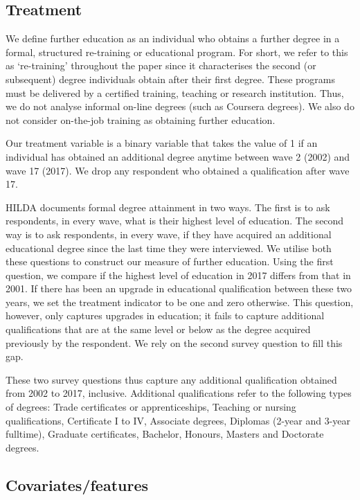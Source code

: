\documentclass[12pt, a4paper]{article}
\begin{document}
\subsection{Treatment}

We define further education as an individual who obtains a further degree in a formal, structured re-training or educational program. For short, we refer to this as `re-training' throughout the paper since it characterises the second (or subsequent) degree individuals obtain after their first degree. These programs must be delivered by a certified training, teaching or research institution. Thus, we do not analyse informal on-line degrees (such as Coursera degrees). We also do not consider on-the-job training as obtaining further education.

Our treatment variable is a binary variable that takes the value of 1 if an individual has obtained an additional degree anytime between wave 2 (2002) and wave 17 (2017). We drop any respondent who obtained a qualification after wave 17. 

HILDA documents formal degree attainment in two ways. The first is to ask respondents, in every wave, what is their highest level of education. The second way is to ask respondents, in every wave, if they have acquired an additional educational degree since the last time they were interviewed. We utilise both these questions to construct our measure of further education. Using the first question, we compare if the highest level of education in 2017 differs from that in 2001. If there has been an upgrade in educational qualification between these two years, we set the treatment indicator to be one and zero otherwise. This question, however, only captures upgrades in education; it fails to capture additional qualifications that are at the same level or below as the degree acquired previously by the respondent. We rely on the second survey question to fill this gap.

These two survey questions thus capture any additional qualification obtained from 2002 to 2017, inclusive. Additional qualifications refer to the following types of degrees: Trade certificates or apprenticeships, Teaching or nursing qualifications, Certificate I to IV, Associate degrees, Diplomas (2-year and 3-year fulltime), Graduate certificates, Bachelor, Honours, Masters and Doctorate degrees.

\subsection{Covariates/features}
\end{document}
